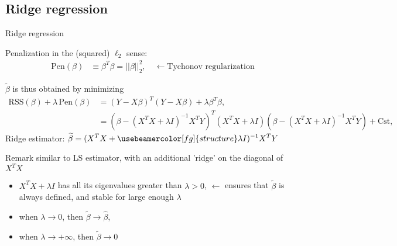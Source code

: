 \documentclass[compress, smaller, serif, 9pt]{beamer}
\newcommand{\structuretext}[1]{{\usebeamercolor[fg]{structure} #1}}
\newcommand{\doigt}{\structuretext{\noindent \Pisymbol{pzd}{43}}}
\begin{document}
\subsection{Ridge regression}
\begin{frame}{Ridge regression}

Penalization in the (squared) $\ell_2$ sense:
\begin{align*}
 \textrm{Pen}(\beta)&\equiv \beta^T \beta= ||\beta||_2^2, \quad \leftarrow \textrm{Tychonov regularization}
\end{align*}

$\widetilde{\beta}$ is thus obtained by minimizing
\begin{align*}
 { \scriptstyle \textrm{RSS}(\beta)    + 
  \lambda\, \textrm{Pen}(\beta)} & { \scriptstyle = 
  (Y-X\beta)^T (Y-X\beta) + \lambda \beta^T \beta,}\\
 & {\scriptstyle = \left( \beta -(X^T X + \lambda I)^{-1} X^T Y \right)^T \left(X^T X + \lambda I\right)
 \left( \beta -(X^T X + \lambda I)^{-1} X^T Y \right) + \textrm{Cst}},
\end{align*}
\structuretext{Ridge estimator: }
$\begin{displaystyle}
 \widetilde{\beta}= (X^T X + \structuretext{ \lambda I})^{-1} X^T Y
\end{displaystyle}$
\begin{block}{Remark}
  similar to LS estimator,  with an additional 'ridge' on the diagonal of $X^TX$
 \begin{itemize}
  \item $X^T X+\lambda I$ has all its eigenvalues greater than $\lambda > 0$, $\leftarrow$ ensures that
  $\widetilde{\beta}$ is always defined, and stable for large enough $\lambda$
  \item[\doigt] when $\lambda \rightarrow 0$, then $\widetilde{\beta} \rightarrow \widehat{\beta}$,
  \item[\doigt] when $\lambda \rightarrow +\infty$, then  $\widetilde{\beta} \rightarrow 0$
 \end{itemize}

\end{block}
\end{frame}
\end{document}
